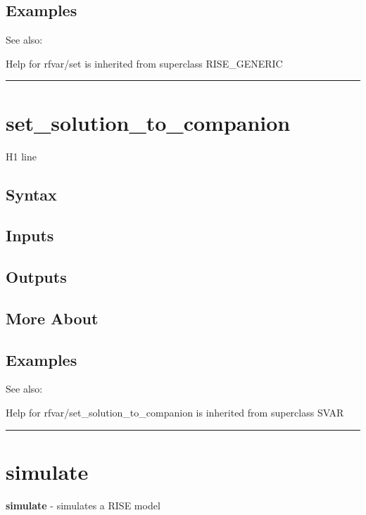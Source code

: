 \documentclass[letterpaper,10pt,english]{sphinxmanual}
\begin{document}
\subsection{Examples}
\label{classes/models/@rfvar/rfvar:id134}
See also:

Help for rfvar/set is inherited from superclass RISE\_GENERIC


\bigskip\hrule{}\bigskip



\section{set\_solution\_to\_companion}
\label{classes/models/@rfvar/rfvar:id135}\label{classes/models/@rfvar/rfvar:set-solution-to-companion}
H1 line


\subsection{Syntax}
\label{classes/models/@rfvar/rfvar:id136}

\subsection{Inputs}
\label{classes/models/@rfvar/rfvar:id137}

\subsection{Outputs}
\label{classes/models/@rfvar/rfvar:id138}

\subsection{More About}
\label{classes/models/@rfvar/rfvar:id139}

\subsection{Examples}
\label{classes/models/@rfvar/rfvar:id140}
See also:

Help for rfvar/set\_solution\_to\_companion is inherited from superclass SVAR


\bigskip\hrule{}\bigskip



\section{simulate}
\label{classes/models/@rfvar/rfvar:id141}\label{classes/models/@rfvar/rfvar:simulate}
\textbf{simulate} - simulates a RISE model
\end{document}
